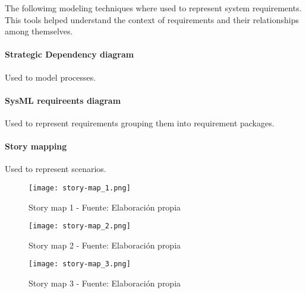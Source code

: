 The followimg modeling techniques where used to represent system requirements. This tools helped understand the context of requirements and their relationships among themselves.
\paragraph{Strategic Dependency diagram} Used to model processes.
\paragraph{SysML requireents diagram} Used to represent requirements grouping them into requirement packages.
\paragraph{Story mapping} Used to represent scenarios.
\begin{figure}[H]
    \centering
    \texttt{[image: story-map\_1.png]}
    \caption{Story map 1 - Fuente: Elaboración propia}
    \label{fig:story_map_1}
\end{figure}
\begin{figure}[H]
    \centering
    \texttt{[image: story-map\_2.png]}
    \caption{Story map 2 - Fuente: Elaboración propia}
    \label{fig:story_map_2}
\end{figure}
\begin{figure}[H]
    \centering
    \texttt{[image: story-map\_3.png]}
    \caption{Story map 3 - Fuente: Elaboración propia}
    \label{fig:story_map_3}
\end{figure}

